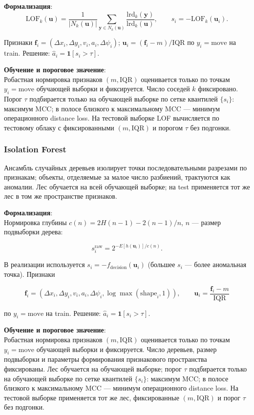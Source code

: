 \documentclass[a4paper,12pt]{report}
\begin{document}
	\textbf{Формализация}:\\
	$$\mathrm{LOF}_k(\mathbf u)=\frac{1}{|N_k(\mathbf u)|}\sum_{\mathbf y\in N_k(\mathbf u)}\frac{\mathrm{lrd}_k(\mathbf y)}{\mathrm{lrd}_k(\mathbf u)}, \qquad s_i=-\mathrm{LOF}_k(\mathbf u_i).$$

	Признаки $\mathbf f_i=(\Delta x_i,\Delta y_i,v_i,a_i,\Delta\psi_i)$; $\mathbf u_i=(\mathbf f_i-m)/\mathrm{IQR}$ по $y_i=\mathrm{move}$ на train. Решение: $\hat a_i=\mathbf{1}[s_i>\tau]$.

	\textbf{Обучение и пороговое значение}:\\
	Робастная нормировка признаков $(m,\mathrm{IQR})$ оценивается только по точкам $y_i=\mathrm{move}$ обучающей выборки и фиксируется. Число соседей $k$ фиксировано. Порог $\tau$ подбирается только на обучающей выборке по сетке квантилей $\{s_i\}$: максимум MCC; в полосе близкого к максимальному MCC — минимум операционного distance loss. На тестовой выборке LOF вычисляется по тестовому облаку с фиксированными $(m,\mathrm{IQR})$ и порогом $\tau$ без подгонки.

	\subsubsection{Isolation Forest}
	Ансамбль случайных деревьев изолирует точки последовательными разрезами по признакам; объекты, отделяемые за малое число разбиений, трактуются как аномалии. Лес обучается на всей обучающей выборке; на test применяется тот же лес в том же пространстве признаков.

	\textbf{Формализация}:\\
	Нормировка глубины $c(n)=2H(n-1)-2(n-1)/n$, $n$ — размер подвыборки дерева:

	$$s_i^{\mathrm{raw}}=2^{-E[h(\mathbf u_i)]/c(n)}.$$

	В реализации используется $s_i=-f_{\mathrm{decision}}(\mathbf u_i)$ (большее $s_i$ — более аномальная точка). Признаки

	$$\mathbf f_i=(\Delta x_i,\Delta y_i,v_i,a_i,\Delta\psi_i,\log\max(\mathrm{shape}_i,1)), \qquad \mathbf u_i=\frac{\mathbf f_i-m}{\mathrm{IQR}}$$

	по $y_i=\mathrm{move}$ на train. Решение: $\hat a_i=\mathbf{1}[s_i>\tau]$.

	\textbf{Обучение и пороговое значение}:\\
	Робастная нормировка признаков $(m,\mathrm{IQR})$ оценивается только по точкам $y_i=\mathrm{move}$ обучающей выборки и фиксируется. Число деревьев, размер подвыборки и параметры формирования признакового пространства фиксированы. Лес обучается на обучающей выборке; порог $\tau$ подбирается только на обучающей выборке по сетке квантилей $\{s_i\}$: максимум MCC; в полосе близкого к максимальному MCC — минимум операционного distance loss. На тестовой выборке применяется тот же лес, фиксированные $(m,\mathrm{IQR})$ и порог $\tau$ без подгонки.
\end{document}
